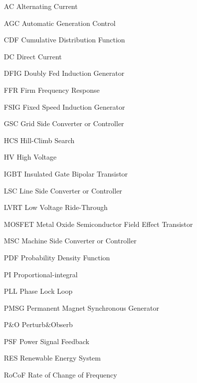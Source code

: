 \begin{glossary}{}

\begin{itemize}[leftmargin=4.5em,align=parleft,labelsep=1cm]
	
\item[AC] Alternating Current
\item[AGC] Automatic Generation Control
\item[CDF] Cumulative Distribution Function
\item[DC] Direct Current
\item[DFIG] Doubly Fed Induction Generator
\item[FFR] Firm Frequency Response
\item[FSIG] Fixed Speed Induction Generator
\item[GSC] Grid Side Converter or Controller
\item[HCS] Hill-Climb Search
\item[HV] High Voltage
\item[IGBT] Insulated Gate Bipolar Transistor
\item[LSC] Line Side Converter or Controller
\item[LVRT] Low Voltage Ride-Through
\item[MOSFET] Metal Oxide Semiconductor Field Effect Transistor
\item[MSC] Machine Side Converter or Controller
\item[PDF] Probability Density Function
\item[PI] Proportional-integral
\item[PLL] Phase Lock Loop
\item[PMSG] Permanent Magnet Synchronous Generator
\item[P\&O] Perturb\&Obserb
\item[PSF] Power Signal Feedback
\item[RES] Renewable Energy System
\item[RoCoF] Rate of Change of Frequency

\end{itemize}

\end{glossary}
